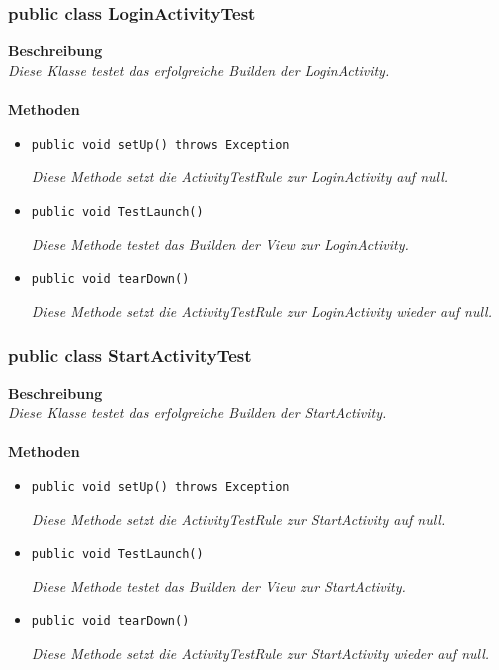\documentclass[a4paper]{scrreprt}
\begin{document}
	\subsubsection{public class LoginActivityTest}
	\textbf{Beschreibung}\\
	\textit{Diese Klasse testet das erfolgreiche Builden der LoginActivity.}\\
	\\	
	\textbf{Methoden}
	\begin{itemize}
		
		\item\texttt{{public void setUp() throws Exception}}
		
		\textit{Diese Methode setzt die ActivityTestRule zur LoginActivity auf null.}
		
		\item\texttt{{public void TestLaunch()}}
		
		\textit{Diese Methode testet das Builden der View zur LoginActivity.}
		
		\item\texttt{{public void tearDown()}}
		
		\textit{Diese Methode setzt die ActivityTestRule zur LoginActivity wieder auf null.}
		
		
	\end{itemize}
	\subsubsection{public class StartActivityTest}
	\textbf{Beschreibung}\\
	\textit{Diese Klasse testet das erfolgreiche Builden der StartActivity.}\\
	\\	
	\textbf{Methoden}
	\begin{itemize}
		
		\item\texttt{{public void setUp() throws Exception}}
		
		\textit{Diese Methode setzt die ActivityTestRule zur StartActivity auf null.}
		
		\item\texttt{{public void TestLaunch()}}
		
		\textit{Diese Methode testet das Builden der View zur StartActivity.}
		
		\item\texttt{{public void tearDown()}}
		
		\textit{Diese Methode setzt die ActivityTestRule zur StartActivity wieder auf null.}
		
		
	\end{itemize}
\end{document}
